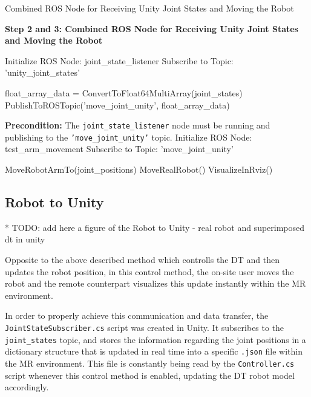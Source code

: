     \begin{algorithm}
        \caption{Combined ROS Node for Receiving Unity Joint States and Moving the Robot}\label{alg:combined_ros_node}
        \begin{algorithmic}[1]
            \State \textbf{Step 2 and 3: Combined ROS Node for Receiving Unity Joint States and Moving the Robot}
            
            \State Initialize ROS Node: joint\_state\_listener
            \State Subscribe to Topic: 'unity\_joint\_states'
            
                \State float\_array\_data = ConvertToFloat64MultiArray(joint\_states)
                \State PublishToROSTopic('move\_joint\_unity', float\_array\_data)
            \EndWhile
            
            \State \textbf{Precondition:} The \texttt{joint\_state\_listener} node must be running and publishing to the \texttt{'move\_joint\_unity'} topic.
            \State Initialize ROS Node: test\_arm\_movement
            \State Subscribe to Topic: 'move\_joint\_unity'
            
                \State MoveRobotArmTo(joint\_positions)
                    \State MoveRealRobot()
                \Else
                    \State VisualizeInRviz()
                \EndIf
            \EndWhile
        \end{algorithmic}
    \end{algorithm}

    
        
    \subsection{Robot to Unity}
    * TODO: add here a figure of the Robot to Unity - real robot and superimposed dt in unity

    Opposite to the above described method which controlls the \ac{DT} and then updates the robot position, in this control method, the on-site user moves the robot and the remote counterpart visualizes this update instantly within the \ac{MR} environment.
    
    In order to properly achieve this communication and data transfer, the \texttt{JointStateSubscriber.cs} script was created in Unity. It subscribes to the \texttt{joint\_states} topic, and stores the information regarding the joint positions in a dictionary structure that is updated in real time into a specific \texttt{.json} file within the \ac{MR} environment. This file is constantly being read by the \texttt{Controller.cs} script whenever this control method is enabled, updating the \ac{DT} robot model accordingly.
    
